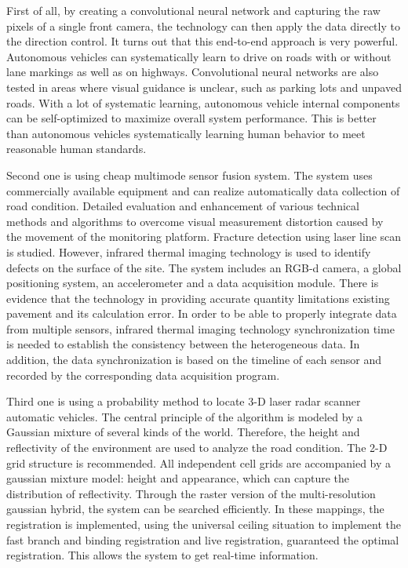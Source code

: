 \documentclass[letterpaper,10pt,draftclsnofoot,onecolumn]{IEEEtran}
\begin{document}
First of all, by creating a convolutional neural network and capturing the raw pixels of a single front camera, the technology can then apply the data directly to the direction control. It turns out that this end-to-end approach is very powerful. Autonomous vehicles can systematically learn to drive on roads with or without lane markings as well as on highways. Convolutional neural networks are also tested in areas where visual guidance is unclear, such as parking lots and unpaved roads. With a lot of systematic learning, autonomous vehicle internal components can be self-optimized to maximize overall system performance. This is better than autonomous vehicles systematically learning human behavior to meet reasonable human standards.
                
Second one is using cheap multimode sensor fusion system. The system uses commercially available equipment and can realize automatically data collection of road condition. Detailed evaluation and enhancement of various technical methods and algorithms to overcome visual measurement distortion caused by the movement of the monitoring platform. Fracture detection using laser line scan is studied. However, infrared thermal imaging technology is used to identify defects on the surface of the site. The system includes an RGB-d camera, a global positioning system, an accelerometer and a data acquisition module. There is evidence that the technology in providing accurate quantity limitations existing pavement and its calculation error. In order to be able to properly integrate data from multiple sensors, infrared thermal imaging technology synchronization time is needed to establish the consistency between the heterogeneous data. In addition, the data synchronization is based on the timeline of each sensor and recorded by the corresponding data acquisition program.
                
Third one is using a probability method to locate 3-D laser radar scanner automatic vehicles. The central principle of the algorithm is modeled by a Gaussian mixture of several kinds of the world. Therefore, the height and reflectivity of the environment are used to analyze the road condition. The 2-D grid structure is recommended. All independent cell grids are accompanied by a gaussian mixture model: height and appearance, which can capture the distribution of reflectivity. Through the raster version of the multi-resolution gaussian hybrid, the system can be searched efficiently. In these mappings, the registration is implemented, using the universal ceiling situation to implement the fast branch and binding registration and live registration, guaranteed the optimal registration. This allows the system to get real-time information.
                
\end{document}
